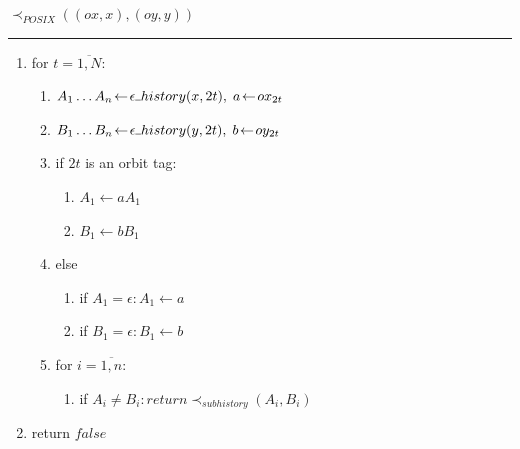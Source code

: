\documentclass{article}
\newcommand{\Xset}{\!\leftarrow\!}
\newcommand{\Xund}{\rule{.4em}{.4pt}} %
\newcommand{\Xeq}{\!=\!}
\theoremstyle{definition}
\begin{document}
\begin{multicols}{2}
    $\prec_{POSIX}((ox, x), (oy, y))$
    \hrule
    \begin{enumerate}[leftmargin=0in]
        \smallskip
        \item[] for $t \Xeq \overline{1, N}$:
        \begin{enumerate}
            \item[] $A_1 \dots A_n \Xset \epsilon \Xund history(x, 2t), \; a \Xset ox_{2t}$
            \item[] $B_1 \dots B_n \Xset \epsilon \Xund history(y, 2t), \; b \Xset oy_{2t}$

            \item[] if $2t$ is an orbit tag:
            \begin{enumerate}
                \item[] $A_1 \Xset a A_1$
                \item[] $B_1 \Xset b B_1$
            \end{enumerate}
            \item[] else
            \begin{enumerate}
                \item[] if $A_1 \Xeq \epsilon: A_1 \Xset a$
                \item[] if $B_1 \Xeq \epsilon: B_1 \Xset b$
            \end{enumerate}

            \item[] for $i \Xeq \overline{1, n}$:
            \begin{enumerate}
                \item[] if $A_i \!\neq\! B_i: return \prec_{subhistory} (A_i, B_i)$
            \end{enumerate}

        \end{enumerate}
        \item[] return $false$
        \\
    \end{enumerate}

    \bigskip


\end{multicols}
\end{document}
